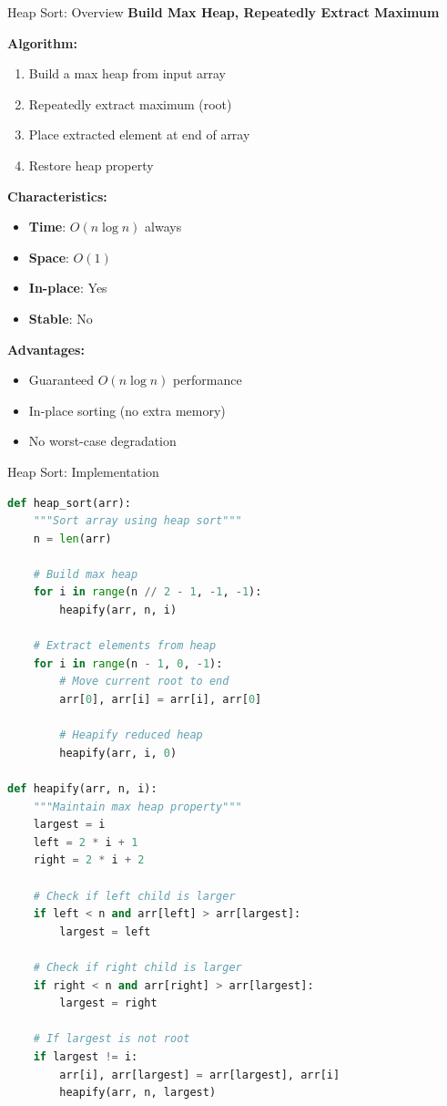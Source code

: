 \documentclass[aspectratio=169]{beamer}
\begin{document}
\begin{frame}{Heap Sort: Overview}
  \textbf{Build Max Heap, Repeatedly Extract Maximum}

  \vspace{0.3cm}
  \textbf{Algorithm:}
  \begin{enumerate}
    \item Build a max heap from input array
    \item Repeatedly extract maximum (root)
    \item Place extracted element at end of array
    \item Restore heap property
  \end{enumerate}

  \vspace{0.3cm}
  \textbf{Characteristics:}
  \begin{itemize}
    \item \textbf{Time}: $O(n \log n)$ always
    \item \textbf{Space}: $O(1)$
    \item \textbf{In-place}: Yes
    \item \textbf{Stable}: No
  \end{itemize}

  \vspace{0.3cm}
  \textbf{Advantages:}
  \begin{itemize}
    \item Guaranteed $O(n \log n)$ performance
    \item In-place sorting (no extra memory)
    \item No worst-case degradation
  \end{itemize}
\end{frame}

\begin{frame}[fragile]{Heap Sort: Implementation}
\begin{lstlisting}[language=Python, basicstyle=\ttfamily\tiny]
def heap_sort(arr):
    """Sort array using heap sort"""
    n = len(arr)

    # Build max heap
    for i in range(n // 2 - 1, -1, -1):
        heapify(arr, n, i)

    # Extract elements from heap
    for i in range(n - 1, 0, -1):
        # Move current root to end
        arr[0], arr[i] = arr[i], arr[0]

        # Heapify reduced heap
        heapify(arr, i, 0)

def heapify(arr, n, i):
    """Maintain max heap property"""
    largest = i
    left = 2 * i + 1
    right = 2 * i + 2

    # Check if left child is larger
    if left < n and arr[left] > arr[largest]:
        largest = left

    # Check if right child is larger
    if right < n and arr[right] > arr[largest]:
        largest = right

    # If largest is not root
    if largest != i:
        arr[i], arr[largest] = arr[largest], arr[i]
        heapify(arr, n, largest)
\end{lstlisting}
\end{frame}
\end{document}
